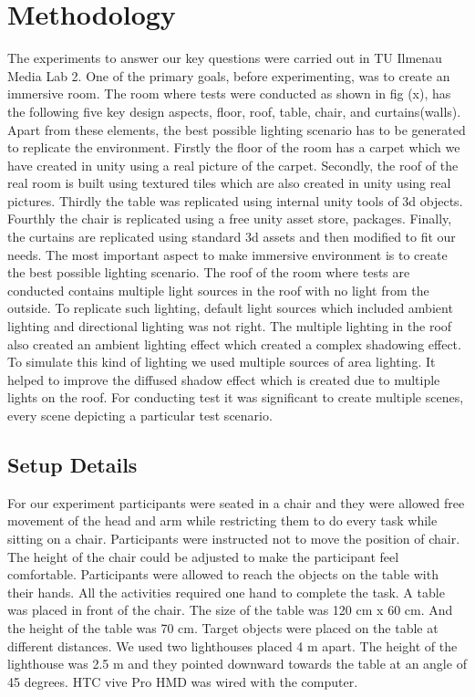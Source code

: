\section{Methodology}
The experiments to answer our key questions were carried out in TU Ilmenau Media Lab 2. One of the primary goals, before experimenting, was to create an immersive room. The room where tests were conducted as shown in fig (x), has the following five key design aspects, floor, roof, table, chair, and curtains(walls). Apart from these elements, the best possible lighting scenario has to be generated to replicate the environment. Firstly the floor of the room has a carpet which we have created in unity using a real picture of the carpet. Secondly, the roof of the real room is built using textured tiles which are also created in unity using real pictures. Thirdly the table was replicated using internal unity tools of 3d objects. Fourthly the chair is replicated using a free unity asset store, packages. Finally, the curtains are replicated using standard 3d assets and then modified to fit our needs.
The most important aspect to make immersive environment is to create the best possible lighting scenario. The roof of the room where tests are conducted contains multiple light sources in the roof with no light from the outside. To replicate such lighting, default light sources which included ambient lighting and directional lighting was not right. The multiple lighting in the roof also created an ambient lighting effect which created a complex shadowing effect. To simulate this kind of lighting we used multiple sources of area lighting. It helped to improve the diffused shadow effect which is created due to multiple lights on the roof. For conducting test it was significant to create multiple scenes, every scene depicting a particular test scenario.

\subsection{Setup Details}
For our experiment participants were seated in a chair and they were allowed free movement of the head and arm while restricting them to do every task while sitting on a chair. Participants were instructed not to move the position of chair. The height of the chair could be adjusted to make the participant feel comfortable. Participants were allowed to reach the objects on the table with their hands. All the activities required one hand to complete the task.
A table was placed in front of the chair. The size of the table was 120 cm x 60 cm. And the height of the table was 70 cm. Target objects were placed on the table at different distances. 
We used two lighthouses placed 4 m apart. The height of the lighthouse was 2.5 m and they pointed downward towards the table at an angle of 45 degrees. 
HTC vive Pro HMD was wired with the computer.



